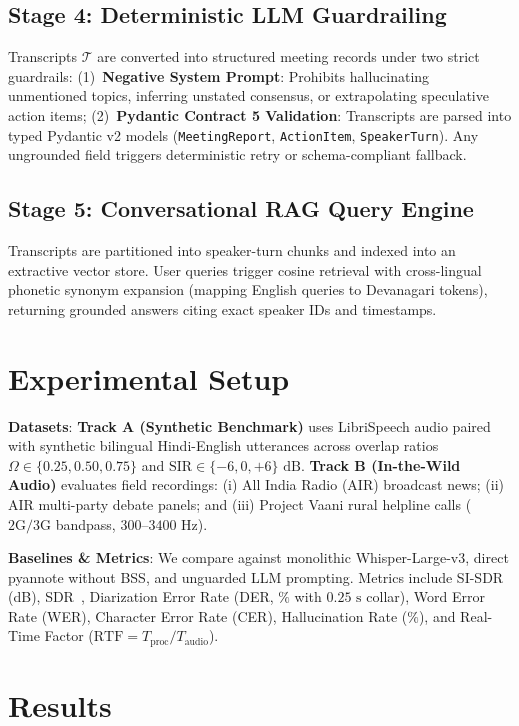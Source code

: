 \documentclass[12pt,a4paper,twocolumn]{article}
\begin{document}
\subsection{Stage 4: Deterministic LLM Guardrailing}
Transcripts $\mathcal{T}$ are converted into structured meeting records under two strict guardrails: (1)~\textbf{Negative System Prompt}: Prohibits hallucinating unmentioned topics, inferring unstated consensus, or extrapolating speculative action items; (2)~\textbf{Pydantic Contract 5 Validation}: Transcripts are parsed into typed Pydantic v2 models (\texttt{MeetingReport}, \texttt{ActionItem}, \texttt{SpeakerTurn}). Any ungrounded field triggers deterministic retry or schema-compliant fallback.

\subsection{Stage 5: Conversational RAG Query Engine}
Transcripts are partitioned into speaker-turn chunks and indexed into an extractive vector store. User queries trigger cosine retrieval with cross-lingual phonetic synonym expansion (mapping English queries to Devanagari tokens), returning grounded answers citing exact speaker IDs and timestamps.

\section{Experimental Setup}
\textbf{Datasets}: \textbf{Track A (Synthetic Benchmark)} uses LibriSpeech audio paired with synthetic bilingual Hindi-English utterances across overlap ratios $\Omega \in \{0.25, 0.50, 0.75\}$ and $\text{SIR} \in \{-6, 0, +6\}\text{ dB}$. \textbf{Track B (In-the-Wild Audio)} evaluates field recordings: (i) All India Radio (AIR) broadcast news; (ii) AIR multi-party debate panels; and (iii) Project Vaani rural helpline calls ($2\text{G}/3\text{G}$ bandpass, $300\text{--}3400\text{ Hz}$).

\textbf{Baselines \& Metrics}: We compare against monolithic Whisper-Large-v3, direct pyannote without BSS, and unguarded LLM prompting. Metrics include SI-SDR (dB), SDR~\cite{vincent2006performance}, Diarization Error Rate (DER, $\%$ with $0.25\text{ s}$ collar), Word Error Rate (WER), Character Error Rate (CER), Hallucination Rate ($\%$), and Real-Time Factor ($\text{RTF} = T_{\text{proc}} / T_{\text{audio}}$).

\section{Results}
\end{document}
